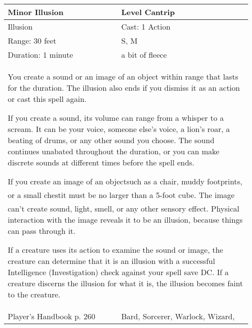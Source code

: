 \documentclass[11pt]{report}
\begin{document}
\begin{table}[H]
	\begin{tabular}{||p{6cm}|p{6cm}||}
		\hline\hline
		\bf{Minor Illusion} & Level Cantrip\\ \hline
		Illusion & Cast: 1 Action\\ \hline
		Range: 30 feet & S, M\\ \hline
		Duration: 1 minute & a bit of fleece\\ \hline
		\multicolumn{2}{||p{12cm}||}{You create a sound or an image of an object within range that lasts for the duration. The illusion also ends if you dismiss it as an action or cast this spell again.

If you create a sound, its volume can range from a whisper to a scream. It can be your voice, someone else’s voice, a lion’s roar, a beating of drums, or any other sound you choose. The sound continues unabated throughout the duration, or you can make discrete sounds at different times before the spell ends.

If you create an image of an objectsuch as a chair, muddy footprints, or a small chestit must be no larger than a 5-foot cube. The image can’t create sound, light, smell, or any other sensory effect. Physical interaction with the image reveals it to be an illusion, because things can pass through it.

If a creature uses its action to examine the sound or image, the creature can determine that it is an illusion with a successful Intelligence (Investigation) check against your spell save DC. If a creature discerns the illusion for what it is, the illusion becomes faint to the creature.}\\ \hline
Player's Handbook p. 260 & Bard, Sorcerer, Warlock, Wizard, \\ \hline\hline
	\end{tabular}
\end{table}
\end{document}
